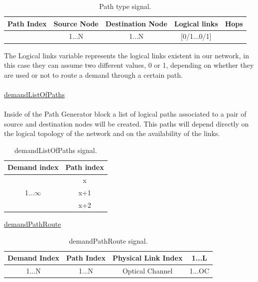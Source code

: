 \begin{table}[H]
	\centering
	\begin{tabular}{|c|c|c|c|c|}
		\hline
		Path Index & Source Node & Destination Node & Logical links & Hops\\ \hline
		& 1...N       & 1...N  & [0/1...0/1]  &    \\ \hline
	\end{tabular}
	\caption{Path type signal.}
	\label{path_signal}
\end{table}
The Logical links variable represents the logical links existent in our network, in this case they can assume two different values, 0 or 1, depending on whether they are used or not to route a demand through a certain path.\\ \\
\underline{demandListOfPaths}\\
\\
Inside of the Path Generator block a list of logical paths associated to a pair of source and destination nodes will be created. This paths will depend directly on the logical topology of the network and on the availability of the links.


\begin{table}[H]
		\centering
	\begin{tabular}{|c|c|l|l|}
		\hline
		Demand index           & \multicolumn{3}{c|}{Path index} \\ \hline
		\multirow{3}{*}{1...$\infty$} & \multicolumn{3}{c|}{x}          \\ \cline{2-4}
		& \multicolumn{3}{c|}{x+1}        \\ \cline{2-4}
		& \multicolumn{3}{c|}{x+2}        \\ \hline
	\end{tabular}
	\caption{demandListOfPaths signal.}
	\label{demandListOfPaths_example}
\end{table}

\underline{demandPathRoute}\\
\begin{table}[H]
	\centering
	\begin{tabular}{|c|c|c|c|}
		\hline
		Demand Index           & Path Index             & Physical Link Index                       & 1...L                   \\ \hline
		\multirow{2}{*}{1...N} & \multirow{2}{*}{1...N} & \multirow{2}{*}{Optical Channel} & \multirow{2}{*}{1...OC} \\
		&                        &                                  &                          \\ \hline
	\end{tabular}
	\caption{demandPathRoute signal.}
	\label{demandPathRoute_signal}
\end{table}




